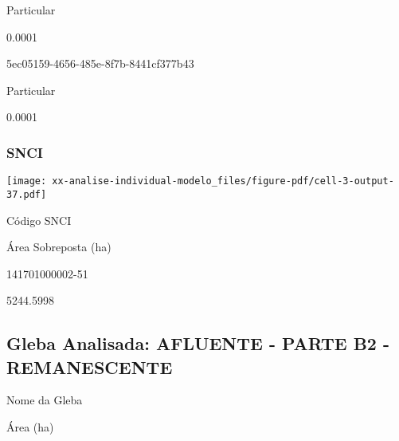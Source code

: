 \documentclass[
  11pt,
  a4paper,
  DIV=11,
  numbers=noendperiod]{scrartcl}
\begin{document}
\n      

Particular

\n      

0.0001

\n    

\n    

\n      

5ec05159-4656-485e-8f7b-8441cf377b43

\n      

Particular

\n      

0.0001

\n    

\n  

\n

\subsubsection{SNCI}\label{snci-1}

\texttt{[image: xx-analise-individual-modelo\_files/figure-pdf/cell-3-output-37.pdf]}

\n  

\n    

\n      

Código SNCI

\n      

Área Sobreposta (ha)

\n    

\n  

\n  

\n    

\n      

141701000002-51

\n      

5244.5998

\n    

\n  

\n

\subsection{Gleba Analisada: AFLUENTE - PARTE B2 -
REMANESCENTE}\label{gleba-analisada-afluente---parte-b2---remanescente}

\n  

\n    

\n      

Nome da Gleba

\n      

Área (ha)

\n    
\end{document}

